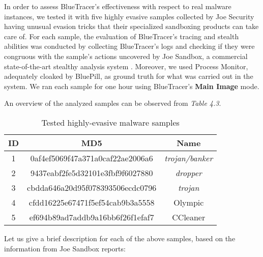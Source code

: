 In order to assess BlueTracer's effectiveness with respect to real malware instances, we tested it with five highly evasive samples collected by Joe Security \cite{JoeBox} having unusual evasion tricks that their specialized sandboxing products can take care of. For each sample, the evaluation of BlueTracer's tracing and stealth abilities was conducted by collecting BlueTracer's logs and checking if they were congruous with the sample's actions uncovered by Joe Sandbox, a commercial state-of-the-art stealthy analysis system \cite{JoeSandbox}. Moreover, we used Process Monitor, adequately cloaked by BluePill, as ground truth for what was carried out in the system.
We ran each sample for one hour using BlueTracer's \textbf{Main Image} mode.

An overview of the analyzed samples can be observed from \textit{Table 4.3}.


\begin{table}[h]
\vspace*{0.5cm}
\begin{center}
 \begin{tabular}{||c c c||} 
 \hline
 \textbf{ID} & \textbf{MD5} & \textbf{Name} \\ [0.5ex] 
 \hline\hline
 1 & 0af4ef5069f47a371a0caf22ae2006a6 & \textit{trojan/banker} \\ 
 \hline
 2 & 9437eabf2fe5d32101e3fbf9f6027880 & \textit{dropper} \\
 \hline
 3 & cbdda646a20d95f078393506ecdc0796 & \textit{trojan}\\
 \hline
 4 & cfdd16225e67471f5ef54cab9b3a5558 & Olympic\\
 \hline
 5 & ef694b89ad7addb9a16bb6f26f1efaf7 & CCleaner\\ [1ex] 
 \hline
\end{tabular}
\end{center}
\caption{Tested highly-evasive malware samples}
\end{table}

Let us give a brief description for each of the above samples, based on the information from Joe Sandbox reports:

